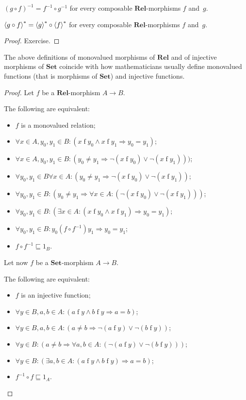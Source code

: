 \begin{obvious}
$(g\circ f)^{-1}=f^{-1}\circ g^{-1}$ for every composable $\mathbf{Rel}$-morphisms
$f$ and~$g$.\end{obvious}
\begin{prop}
$\left\langle g\circ f\right\rangle ^{\ast}=\left\langle g\right\rangle ^{\ast}\circ\left\langle f\right\rangle ^{\ast}$ for every composable
$\mathbf{Rel}$-morphisms $f$ and~$g$.\end{prop}
\begin{proof}
Exercise.\end{proof}
\begin{prop}
The above definitions of monovalued morphisms of $\mathbf{Rel}$ and
of injective morphisms of $\mathbf{Set}$ coincide with how mathematicians
usually define monovalued functions (that is morphisms of $\mathbf{Set}$)
and injective functions.\end{prop}
\begin{proof}
Let $f$ be a $\mathbf{Rel}$-morphism $A\rightarrow B$.

The following are equivalent:
\begin{itemize}
\item $f$ is a monovalued relation;
\item $\forall x\in A,y_{0},y_{1}\in B:(x\mathrel fy_{0}\land x\mathrel fy_{1}\Rightarrow y_{0}=y_{1})$;
\item $\forall x\in A,y_{0},y_{1}\in B:(y_{0}\ne y_{1}\Rightarrow\lnot(x\mathrel fy_{0})\lor\lnot(x\mathrel fy_{1})))$;
\item $\forall y_{0},y_{1}\in B\forall x\in A:(y_{0}\ne y_{1}\Rightarrow\lnot(x\mathrel fy_{0})\lor\lnot(x\mathrel fy_{1}))$;
\item $\forall y_{0},y_{1}\in B:(y_{0}\ne y_{1}\Rightarrow\forall x\in A:(\lnot(x\mathrel fy_{0})\lor\lnot(x\mathrel fy_{1})))$;
\item $\forall y_{0},y_{1}\in B:(\exists x\in A:(x\mathrel fy_{0}\land x\mathrel fy_{1})\Rightarrow y_{0}=y_{1})$;
\item $\forall y_{0},y_{1}\in B:y_{0}\mathrel{(f\circ f^{-1})}y_{1}\Rightarrow y_{0}=y_{1}$;
\item $f\circ f^{-1}\sqsubseteq1_{B}$.
\end{itemize}
Let now $f$ be a $\mathbf{Set}$-morphism $A\rightarrow B$.

The following are equivalent:
\begin{itemize}
\item $f$ is an injective function;
\item $\forall y\in B,a,b\in A:(a\mathrel fy\land b\mathrel fy\Rightarrow a=b)$;
\item $\forall y\in B,a,b\in A:(a\ne b\Rightarrow\lnot(a\mathrel fy)\lor\lnot(b\mathrel fy))$;
\item $\forall y\in B:(a\ne b\Rightarrow\forall a,b\in A:(\lnot(a\mathrel fy)\lor\lnot(b\mathrel fy)))$;
\item $\forall y\in B:(\exists a,b\in A:(a\mathrel fy\land b\mathrel fy)\Rightarrow a=b)$;
\item $f^{-1}\circ f\sqsubseteq1_{A}$.
\end{itemize}
\end{proof}
